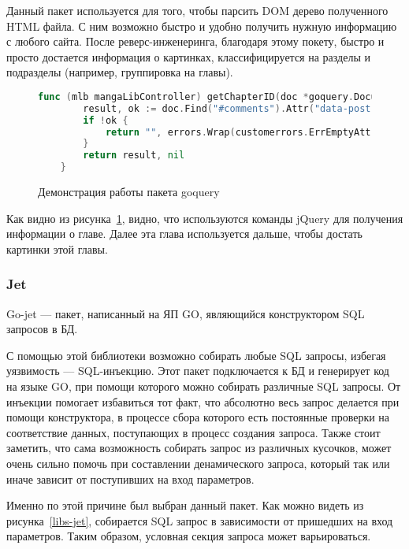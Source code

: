 Данный пакет используется для того, чтобы парсить DOM дерево полученного HTML файла. С ним возможно быстро и удобно получить нужную информацию с любого сайта.
После реверс-инженеринга, благодаря этому покету, быстро и просто достается информация о картинках, классифицируется на разделы и подразделы (например, группировка на главы).

\begin{figure}
	\begin{lstlisting}[language=go]
	func (mlb mangaLibController) getChapterID(doc *goquery.Document) (string, error) {
		result, ok := doc.Find("#comments").Attr("data-post-id")
		if !ok {
			return "", errors.Wrap(customerrors.ErrEmptyAttr, "mangalib: data-post-id")
		}
		return result, nil
	}
	\end{lstlisting}
	\caption{Демонстрация работы пакета goquery}
	\label{libs-goquery}
\end{figure}

Как видно из рисунка~\ref{libs-goquery}, видно, что используются команды jQuery для получения информации о главе. Далее эта глава используется дальше, чтобы достать картинки этой главы.

\subsubsection{Jet}
Go-jet \cite{jet-cite} --- пакет, написанный на ЯП GO, являющийся конструктором SQL запросов в БД.

С помощью этой библиотеки возможно собирать любые SQL запросы, избегая уязвимость --- SQL-инъекцию. 
Этот пакет подключается к БД и генерирует код на языке GO, при помощи которого можно собирать различные SQL запросы.
От инъекции помогает избавиться тот факт, что абсолютно весь запрос делается при помощи конструктора, в процессе сбора которого есть постоянные проверки на соответствие данных,
поступающих в процесс создания запроса.
Также стоит заметить, что сама возможность собирать запрос из различных кусочков, может очень сильно помочь при составлении денамического запроса, который так или иначе зависит от поступивших на вход параметров.

Именно по этой причине был выбран данный пакет.
Как можно видеть из рисунка~\ref{libs-jet}, собирается SQL запрос в зависимости от пришедших на вход параметров. 
Таким образом, условная секция запроса может варьироваться.

